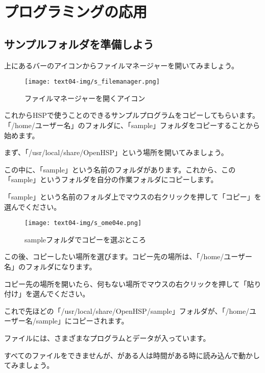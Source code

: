 \newpage
\section{プログラミングの応用}

\subsection{サンプルフォルダを準備しよう}

上にあるバーのアイコンからファイルマネージャーを開いてみましょう。

\begin{figure}[H]
    \begin{center}
      \texttt{[image: text04-img/s\_filemanager.png]}
      \caption{ファイルマネージャーを開くアイコン}
    \end{center}
    \label{fig:prog_menu}
\end{figure}

これからHSPで使うことのできるサンプルプログラムをコピーしてもらいます。「/home/ユーザー名」のフォルダに、「sample」フォルダをコピーすることから始めます。

まず、「/usr/local/share/OpenHSP」という場所を開いてみましょう。

この中に、「sample」という名前のフォルダがあります。これから、この「sample」というフォルダを自分の作業フォルダにコピーします。

「sample」という名前のフォルダ上でマウスの右クリックを押して「コピー」を選んでください。


\begin{figure}[H]
    \begin{center}
      \texttt{[image: text04-img/s\_ome04e.png]}
      \caption{sampleフォルダでコピーを選ぶところ}
    \end{center}
    \label{fig:prog_menu}
\end{figure}

この後、コピーしたい場所を選びます。コピー先の場所は、「/home/ユーザー名」のフォルダになります。

コピー先の場所を開いたら、何もない場所でマウスの右クリックを押して「貼り付け」を選んでください。

これで先ほどの「/usr/local/share/OpenHSP/sample」フォルダが、「/home/ユーザー名/sample」にコピーされます。

ファイルには、さまざまなプログラムとデータが入っています。

すべてのファイルをできませんが、がある人は時間がある時に読み込んで動かしてみましょう。



